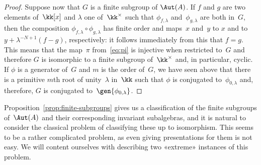 \begin{proof}
Suppose now that $G$ is a finite subgroup of $\Aut(A)$. If  $f$ and $g$ are
two elements of~$\kk[x]$ and $\lambda$ one of~$\kk^\times$ such that
$\phi_{f,\lambda}$ and~$\phi_{g,\lambda}$ are both in~$G$, then the
composition $\phi_{f,\lambda}\circ\phi_{g,\lambda}$ has finite order and
maps~$x$ and~$y$ to $x$ and to~$y+\lambda^{-N+1}(f-g)$, respectively: it
follows immediately from this that $f=g$. This means that the map~$\pi$
from~\eqref{eq:pi} is injective when restricted to~$G$ and therefore $G$ is
isomorphic to a finite subgroup of~$\kk^\times$ and, in particular, cyclic.
If $\phi$ is a generator of~$G$ and $m$ is the order of~$G$, we have seen
above that there is a primitive $m$th root of unity~$\lambda$ in~$\kk$ such
that $\phi$ is conjugated to~$\phi_{0,\lambda}$ and, therefore, $G$ is
conjugated to~$\gen{\phi_{0,\lambda}}$.
\end{proof}

Proposition~\ref{prop:finite-subgroups} gives us a classification of the
finite subgroups of~$\Aut(A)$ and their corresponding invariant
subalgebras, and it is natural to consider the classical problem of classifying
these up to isomorphism. This seems to be a rather complicated problem, as
even giving presentations for them is not easy. We will content ourselves
with describing two «extreme» instances of this problem.

